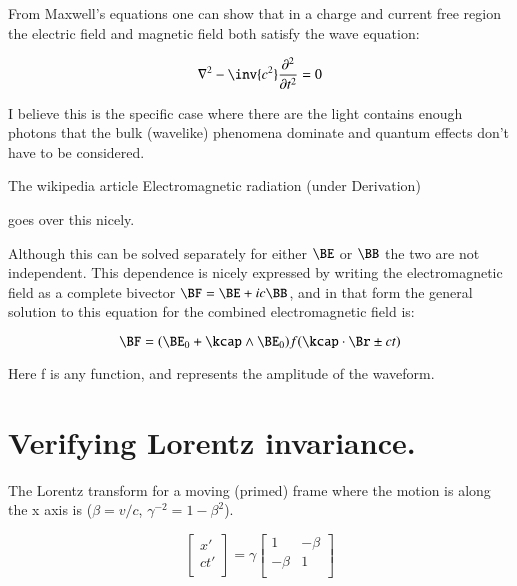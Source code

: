\documentclass{article}      %
\newcommand{\laplacian}[0]{\nabla^2}
\begin{document}
From Maxwell's equations one can show that in a charge and current free region
the electric field and magnetic field both satisfy the wave equation:

\begin{equation}
\laplacian - \inv{c^2}\frac{\partial^2}{\partial t^2} = 0
\end{equation}

I believe this is the specific case where there are the light contains enough
photons that the bulk (wavelike) phenomena dominate and quantum effects don't have to be considered.

The wikipedia article Electromagnetic radiation (under Derivation)


goes over this nicely.

Although this can be solved separately for either $\BE$ or $\BB$ the two are not independent.
This dependence is nicely expressed by writing the electromagnetic field as a complete
bivector $\BF = \BE + i c \BB$, and in that form the
general solution to this equation for the combined electromagnetic
field is:

\begin{equation}
\BF = (\BE_0 + \kcap \wedge \BE_0) f( \kcap \cdot \Br \pm c t)
\end{equation}

Here f is any function, and represents the amplitude of the waveform.

\section{Verifying Lorentz invariance.}

The Lorentz transform for a moving (primed) frame where the motion is
along the x axis is ($\beta = v/c$, $\gamma^{-2} = 1 -\beta^2$).

\begin{equation*}
\begin{bmatrix}
x' \\
c t' \\
\end{bmatrix}
=
\gamma
\begin{bmatrix}
1 & -\beta \\
-\beta & 1 \\
\end{bmatrix}
\end{equation*}
\end{document}
